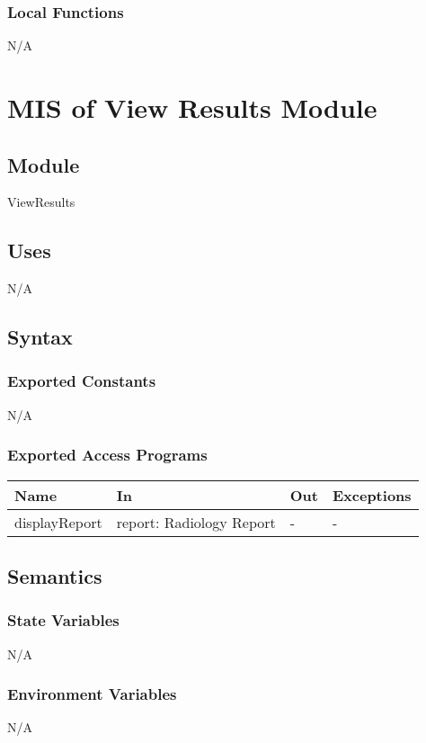 \documentclass[12pt, titlepage]{article}
\begin{document}
\subsubsection{Local Functions}
N/A
\newpage

\section{MIS of View Results Module} \label{Module} 
\subsection{Module}
ViewResults
\subsection{Uses}
N/A
\subsection{Syntax}

\subsubsection{Exported Constants}
N/A
\subsubsection{Exported Access Programs}

\begin{center}
\begin{tabular}{p{3cm} p{5cm} p{2cm} p{2cm}}
\hline
\textbf{Name} & \textbf{In} & \textbf{Out} & \textbf{Exceptions} \\
\hline
displayReport & report: Radiology Report & - & - \\
\hline
\end{tabular}
\end{center}

\subsection{Semantics}

\subsubsection{State Variables}
N/A
\subsubsection{Environment Variables}
N/A
\end{document}
